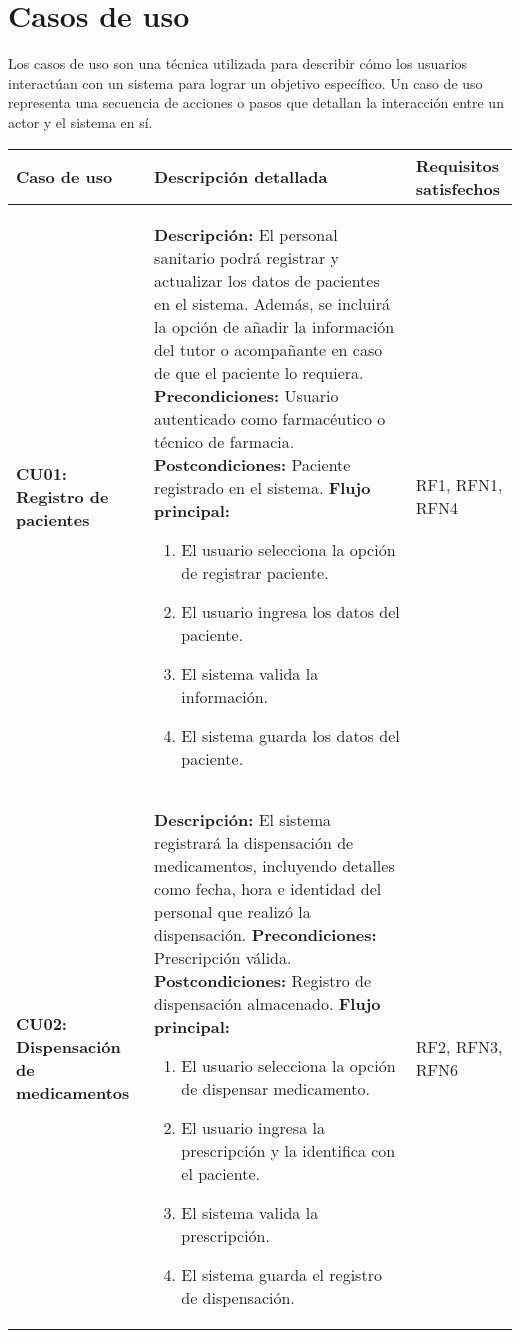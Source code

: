 \section{Casos de uso}
Los casos de uso son una técnica utilizada para describir cómo los usuarios interactúan con un sistema para lograr un objetivo específico. Un caso de uso representa una secuencia de acciones o pasos que detallan la interacción entre un actor y el sistema en sí. \\

\begin{longtable}{|p{3cm}|p{9cm}|p{2cm}|}
	\hline
	\textbf{Caso de uso} & \textbf{Descripción detallada} & \textbf{Requisitos satisfechos} \\
	\hline
	\textbf{CU01: Registro de pacientes} & 
	\textbf{Descripción:} El personal sanitario podrá registrar y actualizar los datos de pacientes en el sistema. Además, se incluirá la opción de añadir la información del tutor o acompañante en caso de que el paciente lo requiera.
	\newline \textbf{Precondiciones:} Usuario autenticado como farmacéutico o técnico de farmacia.
	\newline \textbf{Postcondiciones:} Paciente registrado en el sistema.
	\newline \textbf{Flujo principal:}
	\begin{enumerate}
		\item El usuario selecciona la opción de registrar paciente.
		\item El usuario ingresa los datos del paciente.
		\item El sistema valida la información.
		\item El sistema guarda los datos del paciente.
	\end{enumerate}
	& RF1, RFN1, RFN4 \\
	\hline
	
	\textbf{CU02: Dispensación de medicamentos} & 
	\textbf{Descripción:} El sistema registrará la dispensación de medicamentos, incluyendo detalles como fecha, hora e identidad del personal que realizó la dispensación.
	\newline \textbf{Precondiciones:} Prescripción válida.
	\newline \textbf{Postcondiciones:} Registro de dispensación almacenado.
	\newline \textbf{Flujo principal:}
	\begin{enumerate}
		\item El usuario selecciona la opción de dispensar medicamento.
		\item El usuario ingresa la prescripción y la identifica con el paciente.
		\item El sistema valida la prescripción.
		\item El sistema guarda el registro de dispensación.
	\end{enumerate}
	& RF2, RFN3, RFN6 \\
	\hline
	

\end{longtable}
